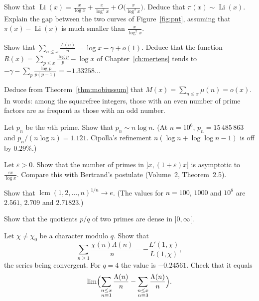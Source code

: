 \begin{exercise}[$\star$]\label{ex:li}
Show that $\operatorname{Li}(x)=\frac x{\log x}+\frac x{\log^2x}+O\bigl(\frac x{\log^3x}\bigr)$. Deduce that $\pi(x)\sim\operatorname{Li}(x)$. Explain the gap between the two curves of Figure~\ref{fig:pnt}, assuming that $\pi(x)-\operatorname{Li}(x)$ is much smaller than $\frac x{\log^2x}$.
\end{exercise}

\begin{exercise}[$\star\star$]\label{ex:rlimit}
Show that $\sum_{n\le x}\frac{\Lambda(n)}n=\log x-\gamma+o(1)$. Deduce that the function $R(x)=\sum_{p\le x}\frac{\log p}p-\log x$ of Chapter~\ref{ch:mertens} tends to
$-\gamma-\sum_p\frac{\log p}{p(p-1)}=-1.33258\ldots$
\end{exercise}

\begin{exercise}[$\star$]\label{ex:mertensfn}
Deduce from Theorem~\ref{thm:mobiussum} that $M(x)=\sum_{n\le x}\mu(n)=o(x)$. In words: among the squarefree integers, those with an even number of prime factors are as frequent as those with an odd number.
\end{exercise}

\begin{exercise}\label{ex:nthprime}
Let $p_n$ be the $n$th prime. Show that $p_n\sim n\log n$. (At $n=10^6$, $p_n=15\,485\,863$ and $p_n/(n\log n)=1.121$. Cipolla's refinement $n(\log n+\log\log n-1)$ is off by $0.29\%$.)
\end{exercise}

\begin{exercise}[$\star$]\label{ex:shortint}
Let $\varepsilon>0$. Show that the number of primes in $]x,(1+\varepsilon)x]$ is asymptotic to $\frac{\varepsilon x}{\log x}$. Compare this with Bertrand's postulate (Volume~2, Theorem~2.5).
\end{exercise}

\begin{exercise}[$\star$]\label{ex:lcm}
Show that $\operatorname{lcm}(1,2,\dots,n)^{1/n}\to e$. (The values for $n=100$, $1000$ and $10^8$ are $2.561$, $2.709$ and $2.71823$.)
\end{exercise}

\begin{exercise}[$\star$]\label{ex:ratios}
Show that the quotients $p/q$ of two primes are dense in $]0,\infty[$.
\end{exercise}

\begin{exercise}[$\star\star$]\label{ex:lprimeseries}
Let $\chi\ne\chi_0$ be a character modulo $q$. Show that
\[
\sum_{n\ge1}\frac{\chi(n)\Lambda(n)}n=-\frac{L'(1,\chi)}{L(1,\chi)},
\]
the series being convergent. For $q=4$ the value is $-0.24561$. Check that it equals
\[
\lim\Bigl(\sum_{\substack{n\le x\\n\equiv1}}\frac{\Lambda(n)}n-\sum_{\substack{n\le x\\n\equiv3}}\frac{\Lambda(n)}n\Bigr).
\]
\end{exercise}

